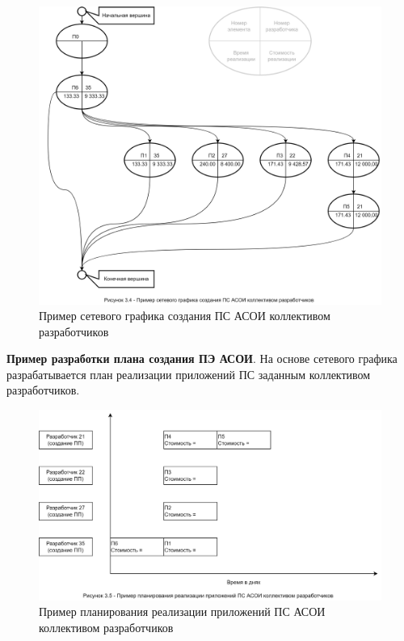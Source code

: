 \documentclass[12pt, a4paper, simple]{eskdtext}
\begin{document}
    \begin{figure}[ph!]
        \centering
        \includegraphics[width=16cm]
            {_docs/Рисунок3-4ПримерСетевогоГрафикаСозданияПСАСОИКоллективомРазработчиков.png}
        \caption{Пример сетевого графика создания ПС АСОИ коллективом разработчиков}
    \end{figure}

    \newpage
    \textbf{Пример разработки плана создания ПЭ АСОИ}.
    На основе сетевого графика разраба­тыва­ется план реализации приложений ПС заданным коллективом разработчиков. 

    \begin{figure}[ph!]
        \centering
        \includegraphics[width=16cm]
            {_docs/Рисунок3-5ПримерПланированияРеализацииПриложенийПСАСОИКоллективомРазработчиков.png}
        \caption{Пример планирования реализации приложений ПС АСОИ коллективом разработчиков}
    \end{figure}
\end{document}
